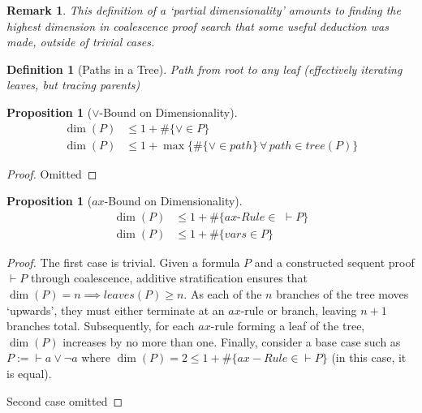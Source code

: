 \documentclass{article}
\def\seteq{:=}
\theoremstyle{indented}
\newtheorem{definition}[sec-ctr]{Definition}
\newtheorem{proposition}[sec-ctr]{Proposition}
\newtheorem*{remark*}{Remark}
\begin{document}
        \begin{remark*}
            This definition of a `partial dimensionality' amounts to finding the highest dimension in coalescence proof search that some useful deduction was made, outside of trivial cases.
        \end{remark*}


        \begin{definition}[Paths in a Tree]
            Path from root to any leaf (effectively iterating leaves, but tracing parents)
        \end{definition}


        \begin{proposition}[$\vee$-Bound on Dimensionality]
            \begin{align*}
                \dim(P) &\leq 1 + \#\{\vee \in P\} \\
                \dim(P) &\leq 1 + \max\{\#\{\vee \in path\} \, \forall \, path \in tree(P)\}
            \end{align*}
        \end{proposition}

        \begin{proof}
            Omitted
        \end{proof}


        \begin{proposition}[$ax$-Bound on Dimensionality]
            \begin{align*}
                \dim(P) &\leq 1 + \#\{ax\textit{-Rule} \in \,\, \vdash P\} \\
                \dim(P) &\leq 1 + \#\{vars \in P\}
            \end{align*}
        \end{proposition}

        \begin{proof}
            The first case is trivial.
            Given a formula $P$ and a constructed sequent proof $\vdash P$ through coalescence, additive stratification ensures that $\dim(P) = n \implies leaves(P) \geq n$.
            As each of the $n$ branches of the tree moves `upwards', they must either terminate at an $ax$-rule or branch, leaving $n + 1$ branches total.
            Subsequently, for each $ax$-rule forming a leaf of the tree, $\dim(P)$ increases by no more than one.
            Finally, consider a base case such as $P \seteq \vdash a \vee \neg a$ where $\dim(P) = 2 \leq 1 + \#\{ax-Rule \in \vdash P\}$ (in this case, it is equal).
            
            Second case omitted
        \end{proof}

    
\end{document}
